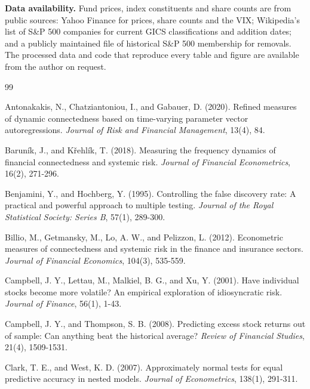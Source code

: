 \documentclass[11pt]{article}
\begin{document}
\bigskip
\noindent\textbf{Data availability.} Fund prices, index constituents and share counts are from public sources: Yahoo Finance for prices, share counts and the VIX; Wikipedia's list of S\&P 500 companies for current GICS classifications and addition dates; and a publicly maintained file of historical S\&P 500 membership for removals. The processed data and code that reproduce every table and figure are available from the author on request.

\begin{thebibliography}{99}
\setlength{\itemsep}{2pt}

Antonakakis, N., Chatziantoniou, I., and Gabauer, D. (2020). Refined measures of dynamic connectedness based on time-varying parameter vector autoregressions. \textit{Journal of Risk and Financial Management}, 13(4), 84.

Barun\'ik, J., and K\v{r}ehl\'ik, T. (2018). Measuring the frequency dynamics of financial connectedness and systemic risk. \textit{Journal of Financial Econometrics}, 16(2), 271-296.

Benjamini, Y., and Hochberg, Y. (1995). Controlling the false discovery rate: A practical and powerful approach to multiple testing. \textit{Journal of the Royal Statistical Society: Series B}, 57(1), 289-300.

Billio, M., Getmansky, M., Lo, A. W., and Pelizzon, L. (2012). Econometric measures of connectedness and systemic risk in the finance and insurance sectors. \textit{Journal of Financial Economics}, 104(3), 535-559.

Campbell, J. Y., Lettau, M., Malkiel, B. G., and Xu, Y. (2001). Have individual stocks become more volatile? An empirical exploration of idiosyncratic risk. \textit{Journal of Finance}, 56(1), 1-43.

Campbell, J. Y., and Thompson, S. B. (2008). Predicting excess stock returns out of sample: Can anything beat the historical average? \textit{Review of Financial Studies}, 21(4), 1509-1531.

Clark, T. E., and West, K. D. (2007). Approximately normal tests for equal predictive accuracy in nested models. \textit{Journal of Econometrics}, 138(1), 291-311.


\end{thebibliography}
\end{document}
